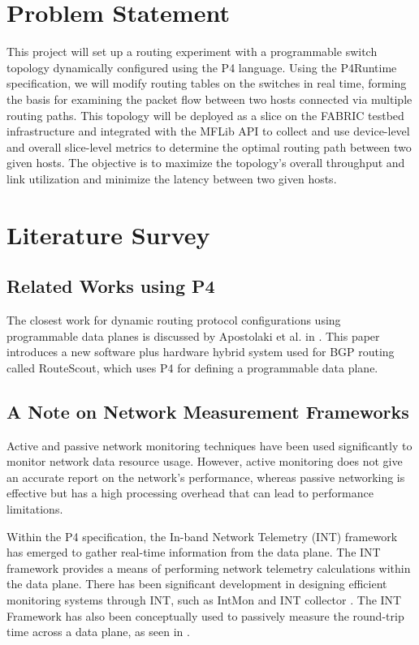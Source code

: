 \documentclass[conference]{IEEEtran}
\begin{document}
    \section{Problem Statement}
    This project will set up a routing experiment with a  programmable switch topology dynamically configured using the P4 language. Using the P4Runtime specification, we will modify routing tables on the switches in real time, forming the basis for examining the packet flow between two hosts connected via multiple routing paths. This topology will be deployed as a slice on the FABRIC testbed infrastructure and integrated with the MFLib API to collect and use device-level and overall slice-level metrics to determine the optimal routing path between two given hosts. The objective is to maximize the topology's overall throughput and link utilization and minimize the latency between two given hosts.

    \section{Literature Survey}
    \subsection{Related Works using P4}
    The closest work for dynamic routing protocol configurations using programmable data planes is discussed by Apostolaki et al. in \cite{b4}. This paper introduces a new software plus hardware hybrid system used for BGP routing called RouteScout, which uses P4 for defining a programmable data plane.

    \subsection{A Note on Network Measurement Frameworks}
    Active and passive network monitoring techniques have been used significantly to monitor network data resource usage. However, active monitoring does not give an accurate report on the network’s performance, whereas passive networking is effective but has a high processing overhead that can lead to performance limitations.

    Within the P4 specification, the In-band Network Telemetry (INT) framework \cite{b5} has emerged to gather real-time information from the data plane. The INT framework provides a means of performing network telemetry calculations within the data plane. There has been significant development in designing efficient monitoring systems through INT, such as IntMon \cite{b6} and INT collector \cite{b7}. The INT Framework has also been conceptually used to passively measure the round-trip time across a data plane, as seen in \cite{b8}.
\end{document}

